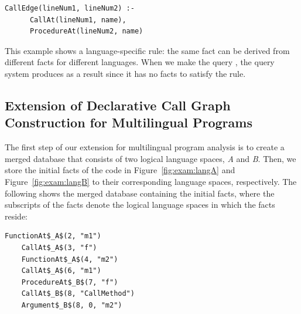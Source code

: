 \begin{lstlisting}[style=mrule]
    CallEdge(lineNum1, lineNum2) :-
      CallAt(lineNum1, name),
      ProcedureAt(lineNum2, name)
\end{lstlisting}

\noindent
This example shows a language-specific rule:
the same fact  can be derived from different facts for
different languages. When we make the query ,
the query system produces  as a result
since it has no facts to satisfy the rule.

%


\subsection{Extension of Declarative Call Graph Construction for Multilingual Programs}


The first step of our extension for multilingual program analysis is to create a
merged database that consists of two logical language spaces, {\it A} and {\it
B}. Then, we store the initial facts of the code in Figure~\ref{fig:exam:langA} and
Figure~\ref{fig:exam:langB} to
their corresponding language spaces, respectively. The following shows the merged
database containing the initial facts, where the subscripts of the facts denote
the logical language spaces in which the facts reside: 

\begin{lstlisting}[style=mrule]
    FunctionAt$_A$(2, "m1")
    CallAt$_A$(3, "f")
    FunctionAt$_A$(4, "m2")
    CallAt$_A$(6, "m1")
    ProcedureAt$_B$(7, "f")
    CallAt$_B$(8, "CallMethod")
    Argument$_B$(8, 0, "m2")
\end{lstlisting}

